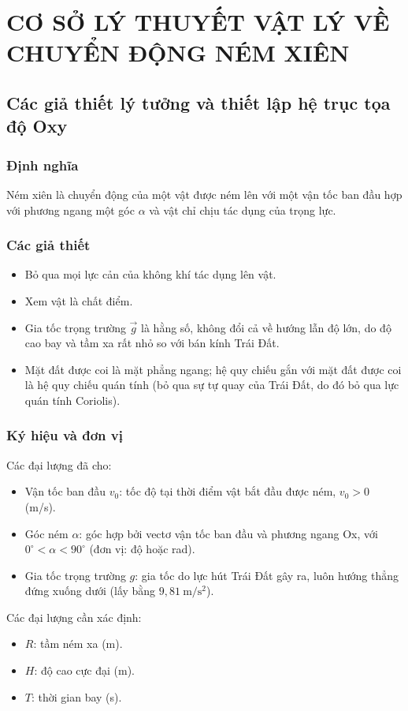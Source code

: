 \chapter{CƠ SỞ LÝ THUYẾT VẬT LÝ VỀ CHUYỂN ĐỘNG NÉM XIÊN}\label{chap:lythuyet}

\section{Các giả thiết lý tưởng và thiết lập hệ trục tọa độ Oxy}

\subsection{Định nghĩa}
Ném xiên là chuyển động của một vật được ném lên với một vận tốc ban đầu hợp với phương ngang một góc $\alpha$ và vật chỉ chịu tác dụng của trọng lực.

\subsection{Các giả thiết}
\begin{itemize}
  \item Bỏ qua mọi lực cản của không khí tác dụng lên vật.
  \item Xem vật là chất điểm.
  \item Gia tốc trọng trường $\vec{g}$ là hằng số, không đổi cả về hướng lẫn độ lớn, do độ cao bay và tầm xa rất nhỏ so với bán kính Trái Đất.
  \item Mặt đất được coi là mặt phẳng ngang; hệ quy chiếu gắn với mặt đất được coi là hệ quy chiếu quán tính (bỏ qua sự tự quay của Trái Đất, do đó bỏ qua lực quán tính Coriolis).
\end{itemize}

\subsection{Ký hiệu và đơn vị}
Các đại lượng đã cho:
\begin{itemize}
  \item Vận tốc ban đầu $v_0$: tốc độ tại thời điểm vật bắt đầu được ném, $v_0 > 0$ (m/s).
  \item Góc ném $\alpha$: góc hợp bởi vectơ vận tốc ban đầu và phương ngang Ox, với $0^\circ < \alpha < 90^\circ$ (đơn vị: độ hoặc rad).
  \item Gia tốc trọng trường $g$: gia tốc do lực hút Trái Đất gây ra, luôn hướng thẳng đứng xuống dưới (lấy bằng $9{,}81~\mathrm{m/s^2}$).
\end{itemize}
Các đại lượng cần xác định:
\begin{itemize}
  \item $R$: tầm ném xa (m).
  \item $H$: độ cao cực đại (m).
  \item $T$: thời gian bay (s).
\end{itemize}

